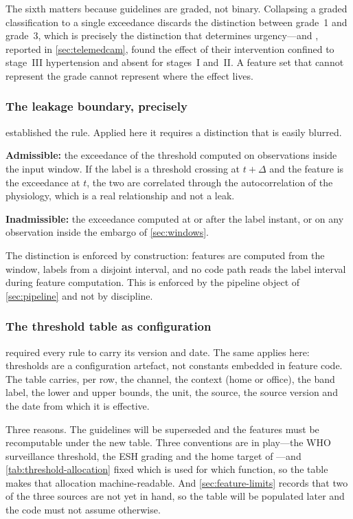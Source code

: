 \documentclass[12pt,a4paper,oneside]{report}
\begin{document}
The sixth matters because guidelines are graded, not binary. Collapsing a graded classification to a single exceedance discards the distinction between grade~1 and grade~3, which is precisely the distinction that determines urgency---and \textcite{kingue2013}, reported in \cref{sec:telemedcam}, found the effect of their intervention confined to stage~III hypertension and absent for stages~I and~II. A feature set that cannot represent the grade cannot represent where the effect lives.

\subsubsection{The leakage boundary, precisely}\label{sec:leak-boundary}

 established the rule. Applied here it requires a distinction that is easily blurred.

\textbf{Admissible:} the exceedance of the threshold computed on observations inside the input window. If the label is a threshold crossing at $t+\Delta$ and the feature is the exceedance at $t$, the two are correlated through the autocorrelation of the physiology, which is a real relationship and not a leak.

\textbf{Inadmissible:} the exceedance computed at or after the label instant, or on any observation inside the embargo of \cref{sec:windows}.

The distinction is enforced by construction: features are computed from the window, labels from a disjoint interval, and no code path reads the label interval during feature computation. This is enforced by the pipeline object of \cref{sec:pipeline} and not by discipline.

\subsubsection{The threshold table as configuration}\label{sec:threshold-table}

 required every rule to carry its version and date. The same applies here: thresholds are a configuration artefact, not constants embedded in feature code. The table carries, per row, the channel, the context (home or office), the band label, the lower and upper bounds, the unit, the source, the source version and the date from which it is effective.

Three reasons. The guidelines will be superseded and the features must be recomputable under the new table. Three conventions are in play---the WHO surveillance threshold, the ESH grading and the home target of \textcite{mihevc2025}---and \cref{tab:threshold-allocation} fixed which is used for which function, so the table makes that allocation machine-readable. And \cref{sec:feature-limits} records that two of the three sources are not yet in hand, so the table will be populated later and the code must not assume otherwise.
\end{document}
